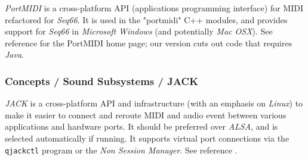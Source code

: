    \textsl{PortMIDI} is a cross-platform API (applications programming
   interface) for MIDI refactored for \textsl{Seq66}.
   It is used in the "portmidi" C++ modules, and provides support for
   \textsl{Seq66} in \textsl{Microsoft Windows} (and potentially
   \textsl{Mac OSX}).
   See reference \cite{portmidi} for the PortMIDI home page; our version
   cuts out code that requires \textsl{Java}.

\subsubsection{Concepts / Sound Subsystems / JACK}
\label{subsubsec:concepts_sound_jack}

   \textsl{JACK} is a cross-platform
   API and infrastructure
   (with an emphasis on \textsl{Linux})
   to make it easier to connect and reroute MIDI
   and audio event between various applications and hardware ports.
   It should be preferred over \textsl{ALSA}, and is selected automatically if
   running.
   It supports virtual port connections via the \texttt{qjackctl} program or
   the \textsl{Non Session Manager}.
   See reference \cite{jack}.


